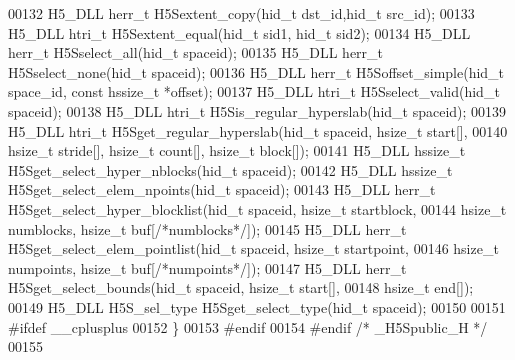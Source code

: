 \begin{DoxyCode}
00132 H5\_DLL herr\_t H5Sextent\_copy(hid\_t dst\_id,hid\_t src\_id);
00133 H5\_DLL htri\_t H5Sextent\_equal(hid\_t sid1, hid\_t sid2);
00134 H5\_DLL herr\_t H5Sselect\_all(hid\_t spaceid);
00135 H5\_DLL herr\_t H5Sselect\_none(hid\_t spaceid);
00136 H5\_DLL herr\_t H5Soffset\_simple(hid\_t space\_id, \textcolor{keyword}{const} hssize\_t *offset);
00137 H5\_DLL htri\_t H5Sselect\_valid(hid\_t spaceid);
00138 H5\_DLL htri\_t H5Sis\_regular\_hyperslab(hid\_t spaceid);
00139 H5\_DLL htri\_t H5Sget\_regular\_hyperslab(hid\_t spaceid, hsize\_t start[],
00140     hsize\_t stride[], hsize\_t count[], hsize\_t block[]);
00141 H5\_DLL hssize\_t H5Sget\_select\_hyper\_nblocks(hid\_t spaceid);
00142 H5\_DLL hssize\_t H5Sget\_select\_elem\_npoints(hid\_t spaceid);
00143 H5\_DLL herr\_t H5Sget\_select\_hyper\_blocklist(hid\_t spaceid, hsize\_t startblock,
00144     hsize\_t numblocks, hsize\_t buf[\textcolor{comment}{/*numblocks*/}]);
00145 H5\_DLL herr\_t H5Sget\_select\_elem\_pointlist(hid\_t spaceid, hsize\_t startpoint,
00146     hsize\_t numpoints, hsize\_t buf[\textcolor{comment}{/*numpoints*/}]);
00147 H5\_DLL herr\_t H5Sget\_select\_bounds(hid\_t spaceid, hsize\_t start[],
00148     hsize\_t end[]);
00149 H5\_DLL H5S\_sel\_type H5Sget\_select\_type(hid\_t spaceid);
00150 
00151 \textcolor{preprocessor}{#ifdef \_\_cplusplus}
00152 \}
00153 \textcolor{preprocessor}{#endif}
00154 \textcolor{preprocessor}{#endif }\textcolor{comment}{/* \_H5Spublic\_H */}\textcolor{preprocessor}{}
00155 
\end{DoxyCode}
